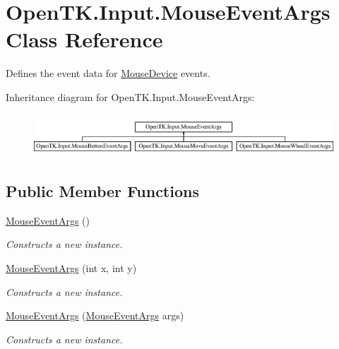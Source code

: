 \hypertarget{class_open_t_k_1_1_input_1_1_mouse_event_args}{\section{Open\-T\-K.\-Input.\-Mouse\-Event\-Args Class Reference}
\label{class_open_t_k_1_1_input_1_1_mouse_event_args}
}


Defines the event data for \hyperlink{class_open_t_k_1_1_input_1_1_mouse_device}{Mouse\-Device} events.  


Inheritance diagram for Open\-T\-K.\-Input.\-Mouse\-Event\-Args\-:\begin{figure}[H]
\begin{center}
\leavevmode
\includegraphics[height=1.602289cm]{class_open_t_k_1_1_input_1_1_mouse_event_args}
\end{center}
\end{figure}
\subsection*{Public Member Functions}
\begin{DoxyCompactItemize}
\item 
\hyperlink{class_open_t_k_1_1_input_1_1_mouse_event_args_ad97edef84ab81ff07b12f9e859210c58}{Mouse\-Event\-Args} ()
\begin{DoxyCompactList}\small\item\em Constructs a new instance. \end{DoxyCompactList}\item 
\hyperlink{class_open_t_k_1_1_input_1_1_mouse_event_args_a6f7791d5f699529650adcc1ecdfb3a33}{Mouse\-Event\-Args} (int x, int y)
\begin{DoxyCompactList}\small\item\em Constructs a new instance. \end{DoxyCompactList}\item 
\hyperlink{class_open_t_k_1_1_input_1_1_mouse_event_args_a6c439ae6a66a4e3dc0de1d855246accb}{Mouse\-Event\-Args} (\hyperlink{class_open_t_k_1_1_input_1_1_mouse_event_args}{Mouse\-Event\-Args} args)
\begin{DoxyCompactList}\small\item\em Constructs a new instance. \end{DoxyCompactList}\end{DoxyCompactItemize}
